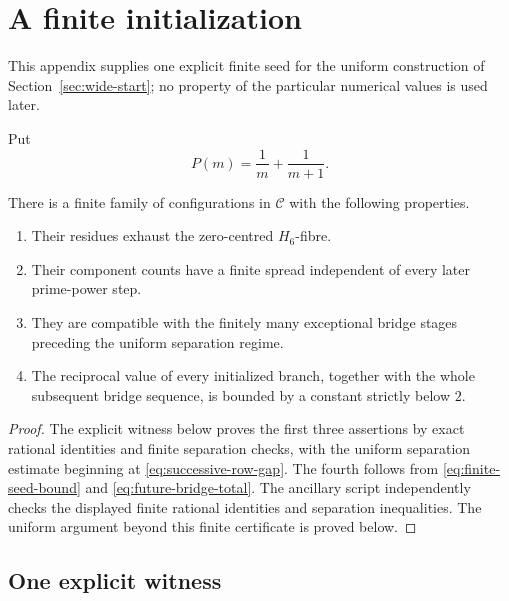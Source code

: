 \section{A finite initialization}
\label{app:prefix-seed}

This appendix supplies one explicit finite seed for the uniform construction of Section~\ref{sec:wide-start}; no property of the particular numerical values is used later.

Put
\[
P(m)=\frac1m+\frac1{m+1}.
\]

\begin{lemma}\label{lem:finite-prefix-initialization}
There is a finite family of configurations in $\mathcal C$ with the following properties.
\begin{enumerate}
\item Their residues exhaust the zero-centred $H_6$-fibre.
\item Their component counts have a finite spread independent of every later prime-power step.
\item They are compatible with the finitely many exceptional bridge stages preceding the uniform separation regime.
\item The reciprocal value of every initialized branch, together with the whole subsequent bridge sequence, is bounded by a constant strictly below $2$.
\end{enumerate}
\end{lemma}

\begin{proof}
The explicit witness below proves the first three assertions by exact rational identities and finite separation checks, with the uniform separation estimate beginning at \eqref{eq:successive-row-gap}.  The fourth follows from \eqref{eq:finite-seed-bound} and \eqref{eq:future-bridge-total}.  The ancillary script independently checks the displayed finite rational identities and separation inequalities.  The uniform argument beyond this finite certificate is proved below.
\end{proof}

\subsection*{One explicit witness}


